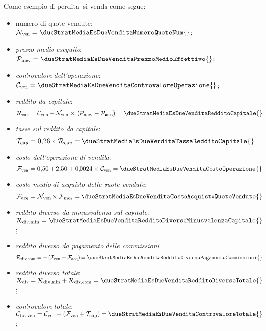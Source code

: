 \documentclass[12pt,a4paper]{article}
\newcommand{\CalcoloCostoOperazioneSim}[1]{\num{0,50} + \num{2,50} + \num{0,0024} \times{} #1}
\newcommand{\CalcoloTasseSim}[1]{\num{0,26} \times{} #1}
\newcommand{\Nven}[1]{\mathcal{N}_{\textrm{ven}#1}}
\newcommand{\Pme}[1]{\mathcal{P}_{\mathrm{me}#1}}
\newcommand{\Pmev}[1]{\mathcal{P}_{\mathrm{mev}#1}}
\newcommand{\Pmes}[1]{\Pme{\mathrm{s}#1}}
\newcommand{\Cven}[1]{\mathcal{C}_{\mathrm{ven}#1}}
\newcommand{\Ctotven}[1]{\mathcal{C}_{\mathrm{tot,ven}#1}}
\newcommand{\Rcap}[1]{\mathcal{R}_{\mathrm{cap}#1}}
\newcommand{\Rdiv}[1]{\mathcal{R}_{\mathrm{div}#1}}
\newcommand{\Rdivmin}[1]{\mathcal{R}_{\mathrm{div,min}#1}}
\newcommand{\Rdivcom}[1]{\mathcal{R}_{\mathrm{div,com}#1}}
\newcommand{\Tredcap}[1]{\mathcal{T}_{\mathrm{cap}#1}}
\newcommand{\Facq}[1]{\mathcal{F}_{\mathrm{acq}#1}}
\newcommand{\Fven}[1]{\mathcal{F}_{\mathrm{ven}#1}}
\newcommand{\Fmcs}[1]{\mathcal{F}_{\mathrm{mcs}#1}}
\begin{document}
Come esempio di perdita, si venda come segue:
\begin{itemize}
\item numero di quote vendute:
  \(\Nven{} = \dueStratMediaEsDueVenditaNumeroQuoteNum{}\);
\item \emph{prezzo medio eseguito}:
  \(\Pmev{} = \dueStratMediaEsDueVenditaPrezzoMedioEffettivo{}\);
\item \emph{controvalore dell'operazione}:
  \(\Cven{} = \dueStratMediaEsDueVenditaControvaloreOperazione{}\);

\item \emph{reddito da capitale}:
  \begin{equation*}
    \Rcap{}
    = \Cven{} - \Nven{} \times{} \left( \Pmev{} - \Pmes{} \right)
    = \dueStratMediaEsDueVenditaRedditoCapitale{}
  \end{equation*}
\item \emph{tasse sul reddito da capitale}:
  \begin{equation*}
    \Tredcap{} = \CalcoloTasseSim{\Rcap{}} = \dueStratMediaEsDueVenditaTassaRedditoCapitale{}
  \end{equation*}

\item \emph{costo dell'operazione di vendita}:
  \begin{equation*}
    \Fven{} = \CalcoloCostoOperazioneSim{\Cven{}} = \dueStratMediaEsDueVenditaCostoOperazione{}
  \end{equation*}
\item \emph{costo medio di acquisto delle quote vendute}:
  \begin{equation*}
    \Facq{} = \Nven{} \times{} \Fmcs{} = \dueStratMediaEsDueVenditaCostoAcquistoQuoteVendute{}
  \end{equation*}
\item \emph{reddito diverso da minusvalenza sul capitale}:
  \(\Rdivmin{} = \dueStratMediaEsDueVenditaRedditoDiversoMinusvalenzaCapitale{}\);
\item \emph{reddito diverso da pagamento delle commissioni}:
  \begin{equation*}
    \Rdivcom{}
    = - \left( \Fven{} + \Facq{} \right)
    = \dueStratMediaEsDueVenditaRedditoDiversoPagamentoCommissioni{}
  \end{equation*}
\item \emph{reddito diverso totale}:
  \(\Rdiv{} = \Rdivmin{} + \Rdivcom{} = \dueStratMediaEsDueVenditaRedditoDiversoTotale{}\);

\item \emph{controvalore totale}:
  \(\Ctotven{} = \Cven{} - \left( \Fven{} + \Tredcap{} \right) = \dueStratMediaEsDueVenditaControvaloreTotale{}\);


\end{itemize}
\end{document}
